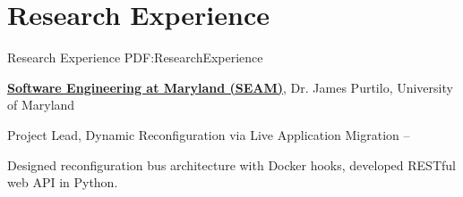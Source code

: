 
\section
{Research Experience}
{Research Experience}
{PDF:ResearchExperience}

\href{https://seam.cs.umd.edu/}
{\textbf{Software Engineering at Maryland (SEAM)}},
Dr. James Purtilo,
University of Maryland

\GapNoBreak
\hspace{1em} 
Project Lead, Dynamic Reconfiguration via Live Application Migration
\hfill
{} --
\begin{detail}
\SubBulletItem
Designed reconfiguration bus architecture with Docker hooks, developed RESTful web API in Python.
\end{detail}